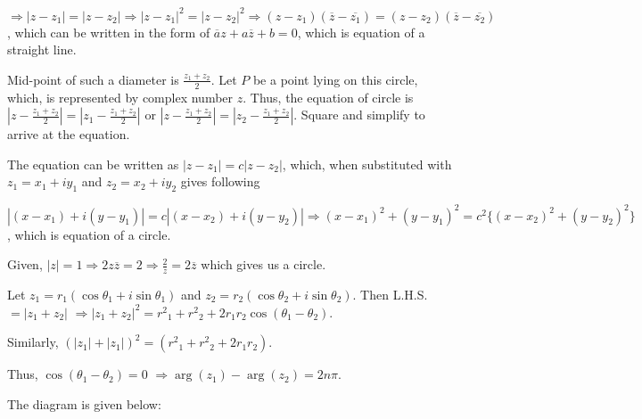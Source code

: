   $\Rightarrow |z - z_1| = |z - z_2| \Rightarrow |z - z_1|^2 = |z - z_2|^2 \Rightarrow (z -
  z_1)(\overline{z} - \overline{z_1}) = (z - z_2)(\overline{z} - \overline{z_2})$, which can be written in
  the form of $\overline{a}z + a\overline{z} + b = 0$, which is equation of a straight line.
\item Mid-point of such a diameter is $\frac{z_1 + z_2}{2}$. Let $P$ be a point lying on this circle, which,
  is represented by complex number $z$. Thus, the equation of circle is $\left|z - \frac{z_1 +
    z_2}{2}\right| = \left|z_1 - \frac{z_1 + z_2}{2}\right|$ or $\left|z - \frac{z_1 + z_2}{2}\right| =
  \left|z_2 - \frac{z_1 + z_2}{2}\right|$. Square and simplify to arrive at the equation.
\item The equation can be written as $\left|z - z_1\right| = c\left|z - z_2\right|$, which, when substituted
  with $z_1 = x_1 + iy_1$ and $z_2 = x_2 + iy_2$ gives following

  $\left|(x - x_1) + i(y - y_1)\right| = c\left|(x - x_2) + i(y - y_2)\right| \Rightarrow (x - x_1)^2 + (y -
  y_1)^2 = c^2\{(x - x_2)^2 + (y - y_2)^2\}$, which is equation of a circle.
\item Given, $|z| = 1 \Rightarrow 2z\overline{z} = 2 \Rightarrow \frac{2}{z} = 2\overline{z}$ which gives us
  a circle.
\item  Let $z_1 = r_1(\cos\theta_1 + i\sin\theta_1)$ and $z_2 = r_2(\cos\theta_2 + i\sin\theta_2)$. Then
  L.H.S. $= \left|z_1 + z_2\right|$ $\Rightarrow \left|z_1 + z_2\right|^2 = {r^2}_1 + {r^2}_2 +
  2r_1r_2\cos(\theta_1 - \theta_2)$.

  Similarly, $\left(\left|z_1\right| + \left|z_1\right|\right)^2 = \left({r^2}_1 + {r^2}_2 + 2r_1r_2\right)$.

  Thus, $\cos(\theta_1 - \theta_2) = 0$ $\Rightarrow \arg(z_1) - \arg(z_2) = 2n\pi$.
\item The diagram is given below:
  \startplacefigure[location={left, none}]
    \startMPcode

